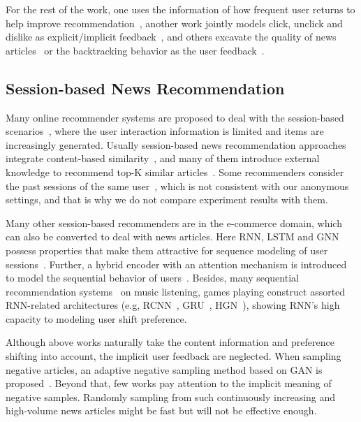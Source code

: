 For the rest of the work, one uses the information of how frequent user returns to help improve recommendation~\cite{zheng2018drn}, another work jointly models click, unclick and dislike as explicit/implicit feedback~\cite{xie2020deep}, and others excavate the quality of news articles~\cite{lu_quality_2019} or the backtracking behavior as the user feedback~\cite{smadja_understanding_2019}.
\subsection{Session-based News Recommendation}
\label{sec:related session}
Many online recommender systems are proposed to deal with the session-based scenarios~\cite{epure_recommending_2017,zhou_variational_2019}, where the user interaction information is limited and items are increasingly generated. Usually session-based news recommendation approaches integrate content-based similarity~\cite{sottocornola2018session}, and many of them introduce external knowledge to recommend top-K similar articles~\cite{symeonidis2021session,sheu2020context,sheu2021knowledge}. Some recommenders consider the past sessions of the same user~\cite{zhang2019dynamic,zhang2018deep}, which is not consistent with our anonymous settings, and that is why we do not compare experiment results with them.

Many other session-based recommenders are in the e-commerce domain, which can also be converted to deal with news articles. Here RNN, LSTM and GNN possess properties that make them attractive for sequence modeling of user sessions~\cite{guo_streaming_2019,hidasi2015session,wang2019modeling,gabriel2019contextual,wu2019session}. Further, a hybrid encoder with an attention mechanism is introduced to model the sequential behavior of users~\cite{li2017neural,liu2018stamp,xu2019time,song_islf_2019,zhang_feature-level_2019}. 
Besides, many sequential recommendation systems~\cite{pereira2019online,xu2019graph} on music listening, games playing construct assorted RNN-related architectures (e.g, RCNN~\cite{xu_recurrent_2019}, GRU~\cite{hidasi2018recurrent}, HGN~\cite{xiao2019hierarchical,ma2019hierarchical}), showing RNN's high capacity to modeling user shift preference.

Although above works naturally take the content information and preference shifting into account, the implicit user feedback are neglected. When sampling negative articles, an adaptive negative sampling method based on GAN is proposed~\cite{wang_neural_2018}. Beyond that, few works pay attention to the implicit meaning of negative samples. Randomly sampling from such continuously increasing and high-volume news articles might be fast but will not be effective enough.

